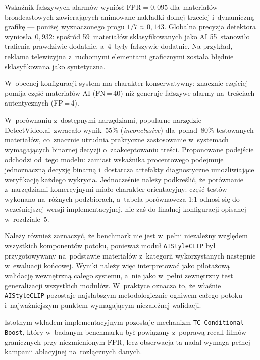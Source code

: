 Wska\'{z}nik fa\l{}szywych alarm\'{o}w wyni\'{o}s\l{}
$\mathrm{FPR} = 0{,}095$ dla~materia\l{}\'{o}w broadcastowych zawieraj\k{a}cych
animowane nak\l{}adki dolnej trzeciej i~dynamiczn\k{a} grafik\k{e} --- poni\.{z}ej
wyznaczonego progu $1/7 \approx 0{,}143$.
Globalna precyzja detektora wynios\l{}a~$0{,}932$: spo\'{s}r\'{o}d 59~materia\l{}\'{o}w
sklasyfikowanych jako AI 55~stanowi\l{}o trafienia prawdziwie dodatnie,
a~4~by\l{}y fa\l{}szywie dodatnie.
Na przyk\l{}ad, reklama telewizyjna z~ruchomymi elementami graficznymi zosta\l{}a
b\l{}\k{e}dnie sklasyfikowana jako syntetyczna.

W~obecnej konfiguracji system ma charakter konserwatywny:
znacznie częściej pomija część materiałów AI (FN\,=\,40)
niż generuje fałszywe alarmy na~treściach autentycznych (FP\,=\,4).

W~por\'{o}wnaniu z~dost\k{e}pnymi narz\k{e}dziami, popularne narz\k{e}dzie
DetectVideo.ai~zwraca\l{}o wynik~55\% (\textit{inconclusive}) dla~ponad~80\%
testowanych materia\l{}\'{o}w, co~znacznie utrudnia praktyczne zastosowanie
w~systemach wymagaj\k{a}cych binarnej decyzji o~zaakceptowaniu tre\'{s}ci.
Proponowane podej\'{s}cie odchodzi od~tego modelu:
zamiast wska\'{z}nika procentowego podejmuje jednoznaczn\k{a} decyzj\k{e}
binarn\k{a} i~dostarcza artefakty diagnostyczne umo\.{z}liwiaj\k{a}ce
weryfikacj\k{e} ka\.{z}dego wykrycia.
Jednocześnie należy podkreślić, że porównanie z~narzędziami komercyjnymi
miało charakter orientacyjny: część testów wykonano na~różnych podzbiorach,
a~tabela porównawcza 1:1 odnosi się do wcześniejszej wersji implementacyjnej,
nie zaś do finalnej konfiguracji opisanej w~rozdziale~5.

Należy również zaznaczyć, że benchmark nie jest w~pełni niezależny względem
wszystkich komponentów potoku, ponieważ moduł \texttt{AIStyleCLIP} był przygotowywany
na~podstawie materiałów z~kategorii wykorzystanych następnie w~ewaluacji końcowej.
Wyniki należy więc interpretować jako pilotażową walidację wewnętrzną całego systemu,
a~nie jako w~pełni zewnętrzny test generalizacji wszystkich modułów. W~praktyce
oznacza to, że właśnie \texttt{AIStyleCLIP} pozostaje najsłabszym metodologicznie
ogniwem całego potoku i~najważniejszym punktem wymagającym niezależnej walidacji.

Istotnym wk\l{}adem implementacyjnym pozostaje mechanizm \texttt{TC Conditional Boost},
który w~badanym benchmarku był powiązany z~poprawą recall film\'{o}w granicznych
przy niezmienionym FPR, lecz obserwacja ta nadal wymaga pełnej kampanii ablacyjnej
na~rozłącznych danych.

